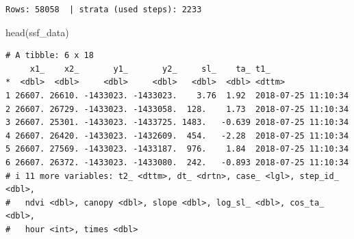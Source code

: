 \documentclass[
  letterpaper,
  DIV=11,
  numbers=noendperiod]{scrartcl}
\newenvironment{Shaded}{\begin{snugshade}}{\end{snugshade}}
\newcommand{\FunctionTok}[1]{\textcolor[rgb]{0.28,0.35,0.67}{#1}}
\newcommand{\NormalTok}[1]{\textcolor[rgb]{0.00,0.23,0.31}{#1}}
\begin{document}
\begin{verbatim}
Rows: 58058  | strata (used steps): 2233 
\end{verbatim}

\begin{Shaded}
\begin{Highlighting}[]
\FunctionTok{head}\NormalTok{(ssf\_data)}
\end{Highlighting}
\end{Shaded}

\begin{verbatim}
# A tibble: 6 x 18
     x1_    x2_       y1_       y2_     sl_    ta_ t1_                
*  <dbl>  <dbl>     <dbl>     <dbl>   <dbl>  <dbl> <dttm>             
1 26607. 26610. -1433023. -1433023.    3.76  1.92  2018-07-25 11:10:34
2 26607. 26729. -1433023. -1433058.  128.    1.73  2018-07-25 11:10:34
3 26607. 25301. -1433023. -1433725. 1483.   -0.639 2018-07-25 11:10:34
4 26607. 26420. -1433023. -1432609.  454.   -2.28  2018-07-25 11:10:34
5 26607. 27569. -1433023. -1433187.  976.    1.84  2018-07-25 11:10:34
6 26607. 26372. -1433023. -1433080.  242.   -0.893 2018-07-25 11:10:34
# i 11 more variables: t2_ <dttm>, dt_ <drtn>, case_ <lgl>, step_id_ <dbl>,
#   ndvi <dbl>, canopy <dbl>, slope <dbl>, log_sl_ <dbl>, cos_ta_ <dbl>,
#   hour <int>, times <dbl>
\end{verbatim}
\end{document}
